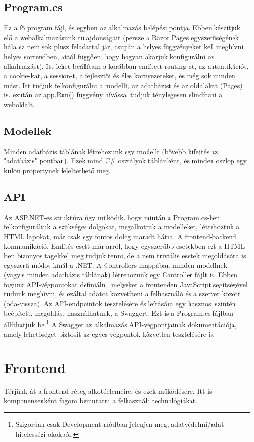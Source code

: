 \subsection{Program.cs}
Ez a fő program fájl, és egyben az alkalmazás belépési pontja. Ebben készítjük
elő a webalkalmazásunk tulajdonságait (persze a Razor Pages egyszerűségének
hála ez nem sok plusz feladattal jár, csupán a helyes függvényeket
kell meghívni helyes sorrendben, attól függően, hogy hogyan
akarjuk konfigurálni az alkalmazást). Itt lehet beállítani a
korábban említett routing-ot, az autentikációt, a cookie-kat,
a session-t, a fejlesztői és éles környezeteket, és még sok minden mást. Itt tudjuk felkonfigurálni a modellt, az adatbázist
és az oldalakat (Pages) is. ezután az app.Run() függvény hívással
tudjuk ténylegesen elindítani a weboldalt.

\subsection{Modellek}
Minden adatbázis táblának létrehozunk egy modellt
(bővebb kifejtés az "adatbázis" pontban). Ezek mind C\# osztályok
táblánként, és minden oszlop egy külön propertynek feleltethető meg.

\subsection{API}
Az ASP.NET-es struktúra úgy működik, hogy miután a 
Program.cs-ben felkonfiguráltuk a szükséges dolgokat, megalkottuk a modelleket, létrehoztuk a HTML lapokat, már csak
egy fontos dolog maradt hátra. A frontend-backend kommunikáció.
Említés esett már arról, hogy egyszerűbb esetekben ezt a HTML-ben
bizonyos tagekkel meg tudjuk tenni, de a nem triviális esetek
megoldására is egyszerű módot kinál a .NET. A Controllers
mappában minden modellnek (vagyis minden adatbázis táblának)
létrehozunk egy Controller fájlt is. Ebben fogunk API-végpontokat
definiálni, melyeket a frontenden JavaScript segítségével tudunk
meghívni, és ezáltal adatot közvetíteni a felhasználó és a szerver
között (oda-vissza). Az API-endpointok tesztelésére és leírására
egy hasznos, szintén beépített, megoldást használhatunk, a Swaggert.
Ezt is a Program.cs fájlban állíthatjuk be.\footnote{Szigorúan csak 
Development módban jelenjen meg, adatvédelmi/adat hitelességi okokból.} A Swagger az alkalmazás API-végpontjainak dokumentációja, amely lehetőséget biztosít az egyes végpontok közvetlen tesztelésére is.
\section{Frontend}
Térjünk át a frontend réteg alkotóelemeire, és ezek működésére. Itt is komponensenként fogom bemutatni a felhasznált technológiákat.

